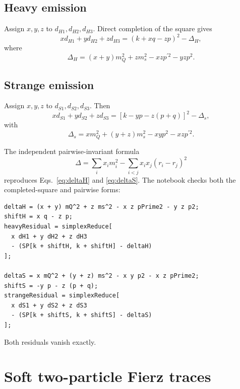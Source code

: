 \documentclass[11pt]{article}
\begin{document}
\subsection{Heavy emission}

Assign $x,y,z$ to $d_{H1},d_{H2},d_{H3}$.  Direct completion of the square
gives
\begin{equation}
  xd_{H1}+yd_{H2}+zd_{H3}
  =(k+xq-zp)^2-\Delta_H,
\end{equation}
where
\begin{equation}
  \boxed{\Delta_H=(x+y)m_Q^2+zm_s^2-xz p^{\prime2}-yzp^2.}
  \label{eq:deltaH}
\end{equation}

\subsection{Strange emission}

Assign $x,y,z$ to $d_{S1},d_{S2},d_{S3}$.  Then
\begin{equation}
  xd_{S1}+yd_{S2}+zd_{S3}
  =[k-yp-z(p+q)]^2-\Delta_s,
\end{equation}
with
\begin{equation}
  \boxed{\Delta_s=xm_Q^2+(y+z)m_s^2-xyp^2-xz p^{\prime2}.}
  \label{eq:deltaS}
\end{equation}

The independent pairwise-invariant formula
\begin{equation}
  \Delta=\sum_i x_i m_i^2
  -\sum_{i<j}x_ix_j(r_i-r_j)^2
\end{equation}
reproduces Eqs.~\eqref{eq:deltaH} and \eqref{eq:deltaS}.  The notebook checks
both the completed-square and pairwise forms:
\begin{lstlisting}
deltaH = (x + y) mQ^2 + z ms^2 - x z pPrime2 - y z p2;
shiftH = x q - z p;
heavyResidual = simplexReduce[
  x dH1 + y dH2 + z dH3
  - (SP[k + shiftH, k + shiftH] - deltaH)
];

deltaS = x mQ^2 + (y + z) ms^2 - x y p2 - x z pPrime2;
shiftS = -y p - z (p + q);
strangeResidual = simplexReduce[
  x dS1 + y dS2 + z dS3
  - (SP[k + shiftS, k + shiftS] - deltaS)
];
\end{lstlisting}
Both residuals vanish exactly.

\section{Soft two-particle Fierz traces}
\end{document}
